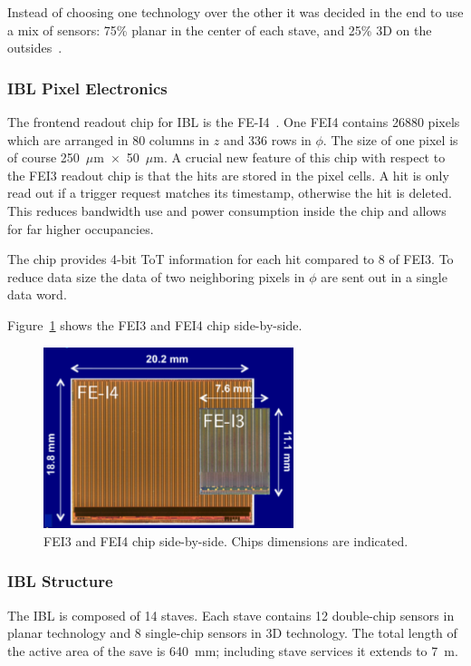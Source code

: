 Instead of choosing one technology over the other it was decided in the end to use a mix of sensors: 75\% planar in the center of each stave, and 25\% 3D on the outsides~\cite{AtlasVertexing2012}.


\subsubsection{IBL Pixel Electronics}

The frontend readout chip for IBL is the FE-I4~\cite{FEI4}. One FEI4 contains 26880 pixels which are arranged in 80 columns in $z$ and 336 rows in $\phi$. The size of one pixel is of course 
250~$\mu$m~$\times$~50~$\mu$m.
A crucial new feature of this chip with respect to the FEI3 readout chip is that the hits are stored in the 
pixel cells. A hit is only read out if a trigger request matches its timestamp, otherwise the hit is deleted. 
This reduces bandwidth use and power consumption inside the chip and allows for far higher 
occupancies.

The chip provides 4-bit ToT information for each hit compared to 8 of FEI3. To reduce data size the data of two neighboring pixels in $\phi$ are sent out in a single data word.

Figure~\ref{fig:TwoFEIs} shows the FEI3 and FEI4 chip side-by-side.
\begin{figure}[!htpb]
\centering
\includegraphics[width=0.65\textwidth]{TwoFEIs.pdf}
\caption{\label{fig:TwoFEIs}FEI3 and FEI4 chip side-by-side. Chips dimensions are indicated.}
\end{figure}

\subsubsection{IBL Structure}
The IBL is composed of 14 staves.
Each stave contains 12 double-chip sensors in planar technology and 8 single-chip sensors in 3D 
technology. The total length of the active area of the save is 640~mm; including stave services it 
extends to 7~m.

